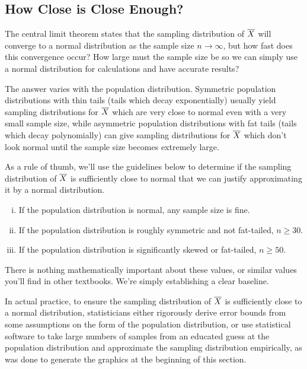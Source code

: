 \subsection*{How Close is Close Enough?}

The central limit theorem states that the sampling distribution of ${\overline{X}}$ will converge to a normal distribution as the sample size $n \to \infty$, but how fast does this convergence occur? How large must the sample size be so we can simply use a normal distribution for calculations and have accurate results?
\par
The answer varies with the population distribution. Symmetric population distributions with thin tails (tails which decay exponentially) usually yield sampling distributions for ${\overline{X}}$ which are very close to normal even with a very small sample size, while asymmetric population distributions with fat tails (tails which decay polynomially) can give sampling distributions for ${\overline{X}}$ which don't look normal until the sample size becomes extremely large.
\par
As a rule of thumb, we'll use the guidelines below to determine if the sampling distribution of ${\overline{X}}$ is sufficiently close to normal that we can justify approximating it by a normal distribution.
\vspace{-0.5em}
\begin{enumerate}[(i)]
\item If the population distribution is normal, any sample size is fine.
\item If the population distribution is roughly symmetric and not fat-tailed, $n \geq 30$.
\item If the population distribution is significantly skewed or fat-tailed, $n \geq 50$.
\end{enumerate}
\par
There is nothing mathematically important about these values, or similar values you'll find in other textbooks. We're simply establishing a clear baseline. 
\par
In actual practice, to ensure the sampling distribution of ${\overline{X}}$ is sufficiently close to a normal distribution, statisticians either rigorously derive error bounds from some assumptions on the form of the population distribution, or use statistical software to take large numbers of samples from an educated guess at the population distribution and approximate the sampling distribution empirically, as was done to generate the graphics at the beginning of this section.
